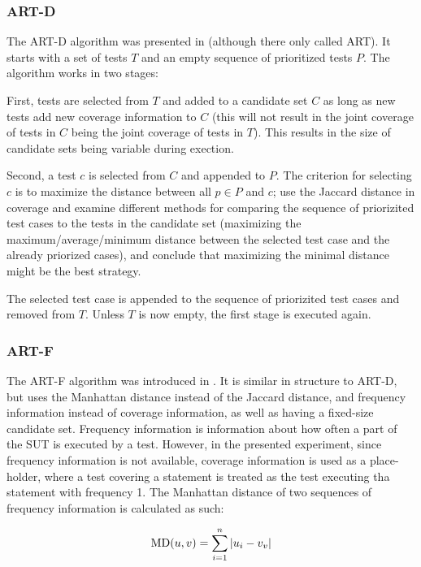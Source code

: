 \subsubsection{ART-D}

The ART-D algorithm was presented in \cite{jiang2009adaptive} (although
there only called ART). It starts with a set of tests $T$ and an empty
sequence of prioritized tests $P$. The algorithm works in two stages:

First, tests are selected from $T$ and added to a candidate set $C$
as long as new tests add new coverage information to $C$ (this will not
result in the joint coverage of tests in $C$ being the joint coverage of
tests in $T$). This results in the size of candidate sets being variable
during exection.

Second, a test $c$ is selected from $C$ and appended to $P$. The
criterion for selecting $c$ is to maximize the distance between all $p
\in P$ and $c$; \cite{jiang2009adaptive} use the Jaccard distance in
coverage and examine different methods for comparing the sequence of
priorizited test cases to the tests in the candidate set (maximizing
the maximum/average/minimum distance between the selected test case and
the already priorized cases), and conclude that maximizing the minimal
distance might be the best strategy.

The selected test case is appended to the sequence of priorizited test
cases and removed from $T$. Unless $T$ is now empty, the first stage is
executed again.

\subsubsection{ART-F}

The ART-F algorithm was introduced in \cite{zhou2012fault}. It
is similar in structure to ART-D, but uses the Manhattan distance
instead of the Jaccard distance, and frequency information instead
of coverage information, as well as having a fixed-size candidate
set. Frequency information is information about how often a part of the
SUT is executed by a test. However, in the presented experiment, since
frequency information is not available, coverage information is used as
a place-holder, where a test covering a statement is treated as the test
executing tha statement with frequency 1. The Manhattan distance of two
sequences of frequency information is calculated as such:

$$\hbox{MD}(u, v)=\sum_{i=1}^{n}|u_i-v_v|$$


